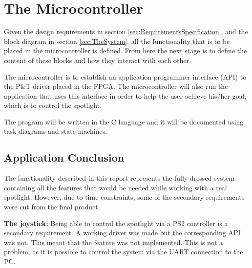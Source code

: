 \section{The Microcontroller}
\label{sec:TheMicrocontroller}

 Given the design requirements in section \ref{sec:RequirementsSpecification}, and the block diagram in section \ref{sec:TheSystem}, all the functionality that is to be placed in the microcontroller is defined. From here the next stage is to define the content of these blocks and how they interact with each other. 
 
 The microcontroller is to establish an application programmer interface (API) to the P\&T driver placed in the FPGA. The microcontroller will also run the application that uses this interface in order to help the user achieve his/her goal, which is to control the spotlight.
 
 The program will be written in the C language and it will be documented using task diagrams and state machines. 
















\subsection{Application Conclusion}

The functionality described in this report represents the fully-dressed system containing all the features that would be needed while working with a real spotlight. However, due to time constraints, some of the secondary requirements were cut from the final product.

\textbf{The joystick:} Being able to control the spotlight via a PS2 controller is a secondary requirement. A working driver was made but the corresponding API was not. This meant that the feature was not implemented. This is not a problem, as it is possible to control the system via the UART connection to the PC.


